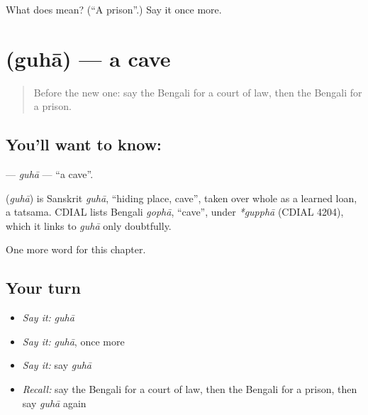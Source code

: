 \begin{tcolorbox}[breakable,colback=teal!4,colframe=teal!35!black,title={Before you move on}]
What does  mean? (\textquotedblleft{}A prison\textquotedblright{}.) Say it once more.
\end{tcolorbox}
\section[\texorpdfstring{\bn{গুহা} (guhā)}{গুহা (guhā)}]{ (guhā) — a cave}

\label{lesson:BN-C189-guha}



\begin{quote}
Before the new one: say the Bengali for a court of law, then the Bengali for a prison.
\end{quote}

\subsection*{You'll want to know: }
\textbf{} — \emph{guhā} — \textquotedblleft{}a cave\textquotedblright{}.

\begin{cousinweb}
\textbf{} (\emph{guhā}) is Sanskrit \emph{guhā}, \textquotedblleft{}hiding place, cave\textquotedblright{}, taken over whole as a learned loan, a tatsama. CDIAL lists Bengali \emph{gophā}, \textquotedblleft{}cave\textquotedblright{}, under \emph{*gupphā} (CDIAL 4204), which it links to \emph{guhā} only doubtfully.
\end{cousinweb}

\begin{grammarlens}[title={What you've built}]
One more word for this chapter.
\end{grammarlens}

\subsection*{Your turn}
\begin{itemize}
\raggedright
  \item \emph{Say it:} \emph{guhā}
  \item \emph{Say it:} \emph{guhā}, once more
  \item \emph{Say it:} say \emph{guhā}
  \item \emph{Recall:} say the Bengali for a court of law, then the Bengali for a prison, then say \emph{guhā} again
\end{itemize}

